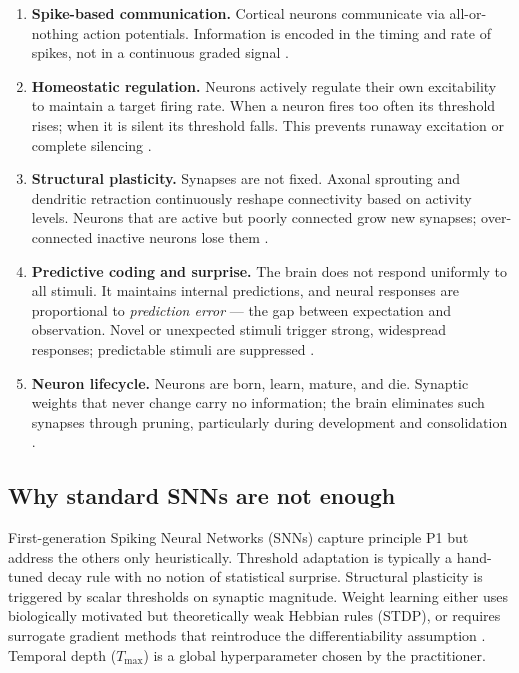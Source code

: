 \documentclass[12pt, a4paper]{article}
\begin{document}
\begin{enumerate}[label=\textbf{P\arabic*.}, leftmargin=2.2em]
    \item \textbf{Spike-based communication.} Cortical neurons communicate via
    all-or-nothing action potentials. Information is encoded in the timing and rate of
    spikes, not in a continuous graded signal \citep{mainen1995reliability}.

    \item \textbf{Homeostatic regulation.} Neurons actively regulate their own
    excitability to maintain a target firing rate. When a neuron fires too often its
    threshold rises; when it is silent its threshold falls. This prevents runaway
    excitation or complete silencing \citep{turrigiano1999homeostatic}.

    \item \textbf{Structural plasticity.} Synapses are not fixed. Axonal sprouting and
    dendritic retraction continuously reshape connectivity based on activity levels.
    Neurons that are active but poorly connected grow new synapses; over-connected
    inactive neurons lose them \citep{bhatt2009dendritic}.

    \item \textbf{Predictive coding and surprise.} The brain does not respond uniformly
    to all stimuli. It maintains internal predictions, and neural responses are
    proportional to \emph{prediction error} --- the gap between expectation and
    observation. Novel or unexpected stimuli trigger strong, widespread responses;
    predictable stimuli are suppressed \citep{rao1999predictive}.

    \item \textbf{Neuron lifecycle.} Neurons are born, learn, mature, and die. Synaptic
    weights that never change carry no information; the brain eliminates such synapses
    through pruning, particularly during development and consolidation
    \citep{huttenlocher1979synaptic}.
\end{enumerate}

\subsection{Why standard SNNs are not enough}

First-generation Spiking Neural Networks (SNNs) capture principle P1 but address the
others only heuristically. Threshold adaptation is typically a hand-tuned decay rule with
no notion of statistical surprise. Structural plasticity is triggered by scalar
thresholds on synaptic magnitude. Weight learning either uses biologically motivated but
theoretically weak Hebbian rules (STDP), or requires surrogate gradient methods that
reintroduce the differentiability assumption \citep{pfeiffer2018deep}. Temporal depth
($T_{\max}$) is a global hyperparameter chosen by the practitioner.
\end{document}
